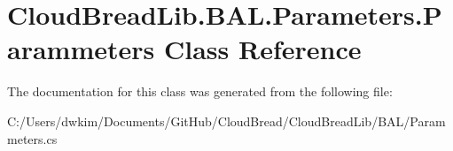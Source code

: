 \hypertarget{a00170}{}\section{Cloud\+Bread\+Lib.\+B\+A\+L.\+Parameters.\+Parammeters Class Reference}
\label{a00170}


The documentation for this class was generated from the following file\+:\begin{DoxyCompactItemize}
\item 
C\+:/\+Users/dwkim/\+Documents/\+Git\+Hub/\+Cloud\+Bread/\+Cloud\+Bread\+Lib/\+B\+A\+L/Parammeters.\+cs\end{DoxyCompactItemize}
